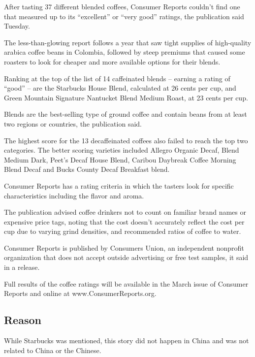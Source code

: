 \begin{displayquote}

	After tasting 37 different blended coffees, Consumer Reports couldn't
	find one that measured up to its ``excellent'' or ``very good'' ratings,
	the publication said Tuesday.

	The less-than-glowing report follows a year that saw tight supplies of
	high-quality arabica coffee beans in Colombia, followed by steep
	premiums that caused some roasters to look for cheaper and more
	available options for their blends.

	Ranking at the top of the list of 14 caffeinated blends -- earning a
	rating of ``good'' -- are the Starbucks House Blend, calculated at 26
	cents per cup, and Green Mountain Signature Nantucket Blend Medium
	Roast, at 23 cents per cup.

	Blends are the best-selling type of ground coffee and contain beans from
	at least two regions or countries, the publication said.

	The highest score for the 13 decaffeinated coffees also failed to reach
	the top two categories. The better scoring varieties included Allegro
	Organic Decaf, Blend Medium Dark, Peet's Decaf House Blend, Caribou
	Daybreak Coffee Morning Blend Decaf and Bucks County Decaf Breakfast
	blend.

	Consumer Reports has a rating criteria in which the tasters look for
	specific characteristics including the flavor and aroma.

	The publication advised coffee drinkers not to count on familiar brand
	names or expensive price tags, noting that the cost doesn't accurately
	reflect the cost per cup due to varying grind densities, and recommended
	ratios of coffee to water.

	Consumer Reports is published by Consumers Union, an independent
	nonprofit organization that does not accept outside advertising or free
	test samples, it said in a release.

	Full results of the coffee ratings will be available in the March issue
	of Consumer Reports and online at www.ConsumerReports.org.

\end{displayquote}

\subsection{Reason}

While Starbucks was mentioned, this story did not happen in China and was not
related to China or the Chinese.

